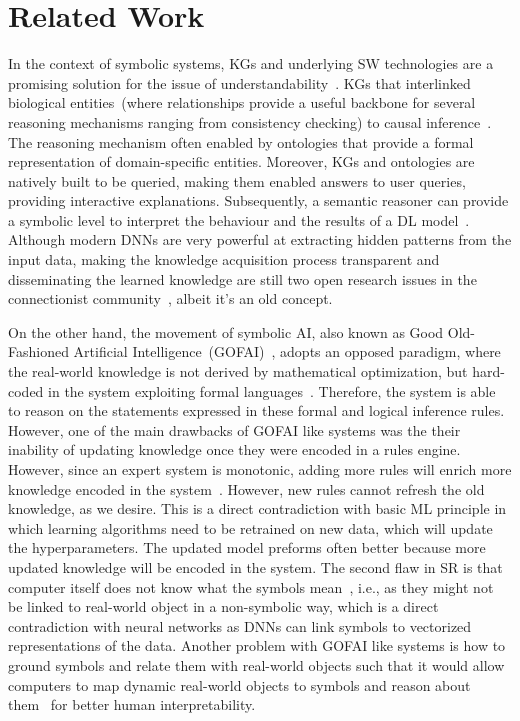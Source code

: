 \section{Related Work}\label{chapter_8:rw}
In the context of symbolic systems, KGs and underlying SW technologies are a promising solution for the issue of understandability~\cite{futia2020integration}. KGs that interlinked biological entities~(where relationships provide a useful backbone for several reasoning mechanisms ranging from consistency checking) to causal inference~\cite{futia2020integration}. The reasoning mechanism often enabled by ontologies that provide a formal representation of domain-specific entities\cite{alirezaie2019semantic}. Moreover, KGs and ontologies are natively built to be queried, making them enabled answers to user queries, providing interactive explanations. Subsequently, a semantic reasoner can provide a symbolic level to interpret the behaviour and the results of a DL model~\cite{futia2020integration}. Although modern DNNs are very powerful at extracting hidden patterns from the input data, making the knowledge acquisition process transparent and disseminating the learned knowledge are still two open research issues in the connectionist community~\cite{futia2020integration}, albeit it's an old concept. 

\hspace*{3.5mm} On the other hand, the movement of symbolic AI, also known as Good Old-Fashioned Artificial Intelligence~(GOFAI)~\cite{GoFI}, adopts an opposed paradigm, where the real-world knowledge is not derived by mathematical optimization, but hard-coded in the system exploiting formal languages~\cite{futia2020integration}. Therefore, the system is able to reason on the statements expressed in these formal and logical inference rules. However, one of the main drawbacks of GOFAI like systems was the their inability of updating knowledge once they were encoded in a rules engine. However, since an expert system is monotonic, adding more rules will enrich more knowledge encoded in the system~\cite{SAI}. However, new rules cannot refresh the old knowledge, as we desire. This is a direct contradiction with basic ML principle in which learning algorithms need to be retrained on new data, which will update the hyperparameters. The updated model preforms often better because more updated knowledge will be encoded in the system. The second flaw in SR is that computer itself does not know what the symbols mean~\cite{SAI}, i.e., as they might not be linked to real-world object in a non-symbolic way, which is a direct contradiction with neural networks as DNNs can link symbols to vectorized representations of the data. Another problem with GOFAI like systems is how to ground symbols and relate them with real-world objects such that it would allow computers to map dynamic real-world objects to symbols and reason about them~\cite{SAI} for better human interpretability. 

